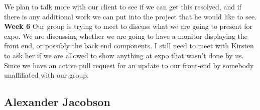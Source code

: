 \documentclass[onecolumn, draftclsnofoot, 10pt, compsoc]{IEEEtran}
\begin{document}
We plan to talk more with our client to see if we can get this resolved, and if there is any additional work we can put into the project that he would like to see. 
\newline
\textbf{Week 6}
Our group is trying to meet to discuss what we are going to present for expo. We are discussing whether we are going to have a monitor displaying the front end, or possibly the back end components. 
I still need to meet with Kirsten to ask her if we are allowed to show anything at expo that wasn't done by us. Since we have an active pull request for an update to our front-end by somebody unaffiliated with our group. 


\subsection{Alexander Jacobson}
\end{document}
